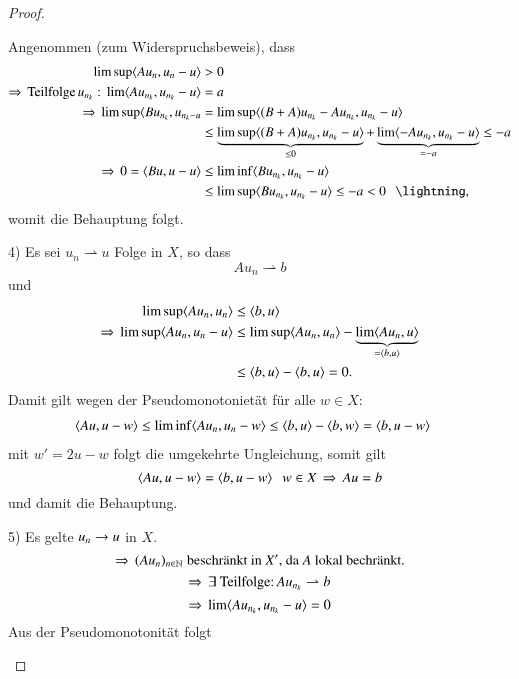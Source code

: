 \begin{proof}
\begin{description}
        \noindent Angenommen (zum Widerspruchsbeweis), dass
        \begin{align*}
            \limsup \lal Au_n , u_n - u \ral &> 0\\
            \Ra \, \text{Teilfolge} \, u_{n_k}:\, \lim \lal Au_{n_k}, u_{n_k}-u\ral &=a\\
            \Ra \, \limsup \lal Bu_{n_k},u_{n_k-u}&= \limsup \lal (B+A)u_{n_k} - A u_{n_k}, u_{n_k}-u\ral
            \\
            &\leq \underbrace{\limsup \lal (B+A) u_{n_k}, u_{n_k}-u\ral}_{\leq 0} +\underbrace{
            \lim \lal -Au_{n_k}, u_{n_k} - u\ral}_{=-a} \leq -a\\
            \Ra \, 0= \lal Bu,u-u\ral &\leq \liminf \lal Bu_{n_k} , u_{n_k}-u\ral\\
            &\leq \limsup \lal Bu_{n_k}, u_{n_k}-u\ral \leq -a <0 \qq \lightning,
        \end{align*}
        womit die Behauptung folgt.
        \item{4)}
        Es sei $u_n\rightharpoonup u$ Folge in $X$, so dass
        \[
            Au_n \rightharpoonup b
        \]
        und
        \begin{align*}
            \limsup \langle Au_n,u_n\rangle &\leq \langle b,u\rangle\\
            \Rightarrow \,  \limsup \langle Au_n, u_n - u\rangle &\leq \limsup \langle Au_n, u_n\rangle - \underbrace{
            \lim\langle Au_n, u\rangle }_{=\langle b,u\rangle }\\
            & \leq \langle b,u\rangle - \langle b,u\rangle = 0.
        \end{align*}
        Damit gilt wegen der Pseudomonotonietät für alle $w\in X$:
        \begin{align*}
            \langle Au, u-w\rangle &\leq \liminf \langle Au_n, u_n - w\rangle \leq \langle b,u \rangle - \langle b,w\rangle
            = \langle b, u-w\rangle
        \end{align*}
        mit $w'=2u-w$ folgt die umgekehrte Ungleichung, somit gilt
        \[
            \langle Au, u-w \rangle = \langle b , u-w \rangle \hspace{.25cm} w\in X \, \Rightarrow \, Au=b 
        \]
        und damit die Behauptung.
        \item{5)}
        Es gelte $u_n \rightarrow u$ in $X$.
        \[
            \Rightarrow \, (Au_n)_{n\in \mathbb{N}} \text{ beschränkt in $X'$, da $A$ lokal bechränkt.}
        \]
        \[
            \Rightarrow \, \exists \text{ Teilfolge:} \, Au_{n_k}\rightharpoonup b
        \]
        \[
            \Rightarrow \, \lim \langle Au_{n_k},u_{n_k}-u\rangle =0
        \]
        Aus der Pseudomonotonität folgt

\end{description}
\end{proof}
